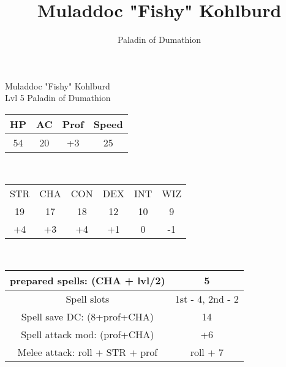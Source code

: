 \documentclass[12pt, xcolor={dvipsnames}]{beamer}
\title{Muladdoc "Fishy" Kohlburd}
\subtitle{Paladin of Dumathion}
\date{\vspace{-10ex}}
\newcommand{\str}{{\color{red}STR}}
\newcommand{\con}{{\color{red}CON}}
\newcommand{\wiz}{{\color{red}WIZ}}
\newcommand{\dex}{{\color{red}DEX}}
\newcommand{\inte}{{\color{red}INT}}
\newcommand{\cha}{{\color{red}CHA}}
\begin{document}
\begin{frame}
  \large
  \centering
  {\color{blue}Muladdoc "Fishy" Kohlburd}\\
  \normalsize{Lvl 5 \color{OliveGreen}Paladin of Dumathion}\\
  \vspace{1em}
  \small
  \centering
  \begin{tabular}{c | c | c | c}
    HP & AC & Prof & Speed\\ \hline
    54 & 20 & +3 & 25\\
  \end{tabular}\\
\vspace{1em}
  \begin{tabular}{c | c | c | c | c | c}
    {\str} & {\cha} & {\con} & {\dex} & {\inte} & {\wiz}\\
    19 & 17 & 18 & 12 & 10 & 9\\\hline
    +4 & +3 & +4 & +1 & 0 & -1\\
  \end{tabular}\\
  \vspace{1em}
  \begin{tabular}{c|c}
  prepared spells: ({\cha} + lvl/2) & {\color{OliveGreen}5}\\ \hline

  Spell slots & 1st - {\color{OliveGreen}4}, 2nd - {\color{OliveGreen}2}\\ \hline

  Spell save DC: (8+prof+{\cha}) & {\color{OliveGreen}14}\\ \hline

  Spell attack mod: (prof+{\cha}) & {\color{OliveGreen}+6}\\ \hline

  Melee attack: roll + {\str} + prof & {\color{OliveGreen}roll + 7}\\
\end{tabular}
\end{frame}
\end{document}
